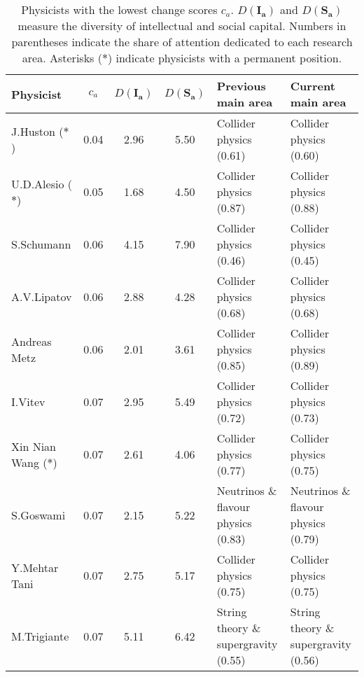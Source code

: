 \begin{table}[H]
\centering
\caption{Physicists with the lowest change scores $c_a$. $D(\bm{I_a})$ and $D(\bm{S_a})$ measure the diversity of intellectual and social capital. Numbers in parentheses indicate the share of attention dedicated to each research area. Asterisks ($\ast$) indicate physicists with a permanent position.}
\label{table:low_change}
\begin{tabular}{p{}|c|c|c|b{}|b{}}
\toprule
              Physicist & $c_a$ & $D(\bm{I_a})$ & $D(\bm{S_a})$ &                   Previous main area &                       Current main area \\
\midrule
      J.Huston ($\ast$) &  0.04 &          2.96 &          5.50 &              Collider physics (0.61) &              Collider physics (0.60)\\ \hline
    U.D.Alesio ($\ast$) &  0.05 &          1.68 &          4.50 &              Collider physics (0.87) &              Collider physics (0.88)\\ \hline
             S.Schumann &  0.06 &          4.15 &          7.90 &              Collider physics (0.46) &              Collider physics (0.45)\\ \hline
            A.V.Lipatov &  0.06 &          2.88 &          4.28 &              Collider physics (0.68) &              Collider physics (0.68)\\ \hline
           Andreas Metz &  0.06 &          2.01 &          3.61 &              Collider physics (0.85) &              Collider physics (0.89)\\ \hline
                I.Vitev &  0.07 &          2.95 &          5.49 &              Collider physics (0.72) &              Collider physics (0.73)\\ \hline
 Xin Nian Wang ($\ast$) &  0.07 &          2.61 &          4.06 &              Collider physics (0.77) &              Collider physics (0.75)\\ \hline
              S.Goswami &  0.07 &          2.15 &          5.22 &  Neutrinos \& flavour physics (0.83) &  Neutrinos \& flavour physics (0.79)\\ \hline
          Y.Mehtar Tani &  0.07 &          2.75 &          5.17 &              Collider physics (0.75) &              Collider physics (0.75)\\ \hline
            M.Trigiante &  0.07 &          5.11 &          6.42 & String theory \& supergravity (0.55) & String theory \& supergravity (0.56)\\ \hline

\end{tabular}
\end{table}
